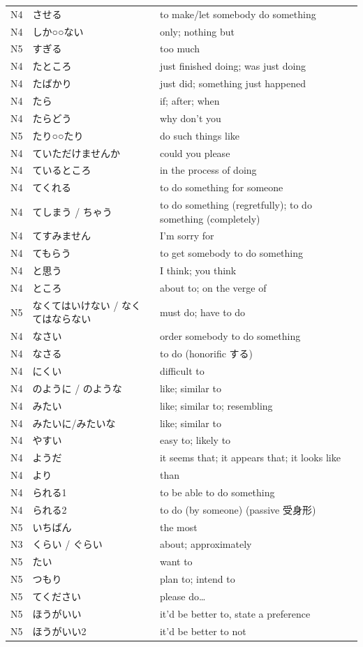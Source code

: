 \begin{longtable}{p{2cm} p{4cm} p{8cm}}
N4	&   させる &       	to make/let somebody do something\\
N4	&   しか○○ない &	    only; nothing but\\
N5	&   すぎる     &   	too much\\
N4	&   たところ    &   	just finished doing; was just doing\\
N4	&   たばかり    &   	just did; something just happened\\
N4	&   たら  &       	if; after; when\\
N4	&   たらどう    &	why don't you\\
N5	&   たり○○たり  &	do such things like\\
N4	&   ていただけませんか&	could you please\\
N4	&   ているところ  &	in the process of doing\\
N4	&   てくれる    &	to do something for someone \\
N4	&   てしまう / ちゃう  &	to do something (regretfully); to do something (completely) \\
N4	&   てすみません  &	I'm sorry for\\
N4	&   てもらう    &	to get somebody to do something\\
N4	&   と思う &       	I think; you think\\
N4	&   ところ     &   	about to; on the verge of\\
N5	&   なくてはいけない / なくてはならない &	must do; have to do\\
N4	&   なさい	&       order somebody to do something\\
N4	&   なさる &       	to do (honorific する) \\
N4	&   にくい     &   	difficult to\\
N4	&   のように / のような &	like; similar to\\
N4	&   みたい &       	like; similar to; resembling\\
N4	&   みたいに/みたいな   &	like; similar to\\
N4	&   やすい &       	easy to; likely to\\
N4	&   ようだ &       	it seems that; it appears that; it looks like\\
N4  &	より  &       	than\\
N4	&   られる1    &   	to be able to do something\\
N4	&   られる2    &   	to do (by someone) (passive 受身形)\\
N5	&   いちばん    &	the most \\
N3	&   くらい / ぐらい   &	about; approximately\\
N5	&   たい  &	want to\\
N5	&   つもり &	plan to; intend to\\
N5	&   てください   &	please do…\\
N5	&   ほうがいい   &	it'd be better to, state a preference\\
N5	&   ほうがいい2  &   	it'd be better to not\\

\end{longtable}

